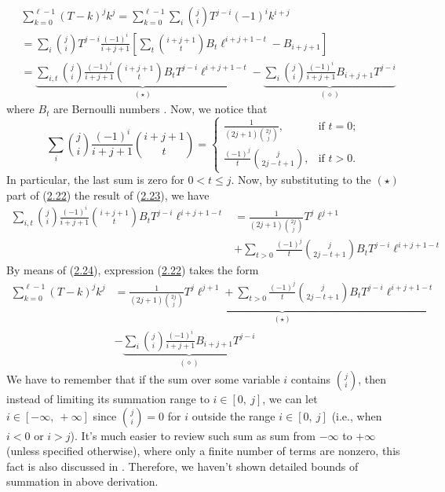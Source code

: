 \documentclass[11pt, letterpaper]{amsart}
\theoremstyle{definition}
\theoremstyle{remark}
\numberwithin{equation}{section}
\begin{document}
\begin{equation}\label{gen_5}
\begin{split}
&\sum_{k=0}^{\ell-1} (T-k)^j k^j =\sum_{k=0}^{\ell-1} \sum_{i} \binom{j}i T^{j-i} (-1)^i k^{i+j}\\
&=\sum_{i} \binom{j}{i} T^{j-i} \frac{(-1)^i}{i+j+1} \left[ \sum_{t} \binom{i+j+1}t B_t \ell^{i+j+1-t} - B_{i+j+1}\right] \\
&=\underbrace{\sum_{i,t}\binom{j}{i} \frac{(-1)^i}{i+j+1} \binom{i+j+1}t B_tT^{j-i}\ell^{i+j+1-t}}_{(\star)}
- \underbrace{\sum_{i} \binom{j}{i}  \frac{(-1)^i}{i+j+1} B_{i+j+1} T^{j-i}}_{(\diamond)}
\end{split}
\end{equation}
where $B_t$ are Bernoulli numbers \cite{14}. Now, we notice that
\begin{equation}\label{gen_6}
\sum_{i} \binom{j}{i} \frac{(-1)^i}{i+j+1} \binom{i+j+1}t
=\begin{cases}
\frac{1}{(2j+1)\binom{2j}j}, & \text{if } t=0;\\
\frac{(-1)^j}{t}\binom{j}{2j-t+1}, & \text{if } t>0.
\end{cases}
\end{equation}
In particular, the last sum is zero for $0<t\leq j$. Now, by substituting to the $(\star)$ part of
(\hyperref[gen_5]{2.22}) the result of (\hyperref[gen_6]{2.23}), we have
\begin{equation}\label{gen_6_1_2}
\begin{split}
\sum_{i,t}\binom{j}{i} \frac{(-1)^i}{i+j+1} \binom{i+j+1}{t} B_tT^{j-i}\ell^{i+j+1-t}
&= \frac{1}{(2j+1)\binom{2j}j}T^{j}\ell^{j+1}\\
&+\sum_{t>0} \frac{(-1)^j}{t}\binom{j}{2j-t+1} B_t T^{j-i}\ell^{i+j+1-t}
\end{split}
\end{equation}
By means of (\hyperref[gen_6_1_2]{2.24}), expression (\hyperref[gen_5]{2.22}) takes the form
\begin{equation}\label{gen_6_1}
\begin{split}
\sum_{k=0}^{\ell-1} (T-k)^j k^j
&=\underbrace{\frac{1}{(2j+1)\binom{2j}j}T^{j}\ell^{j+1}+\sum_{t>0}\frac{(-1)^j}{t}\binom{j}{2j-t+1} B_t T^{j-i}\ell^{i+j+1-t}}_{(\star)} \\
&- \underbrace{\sum_{i} \binom{j}{i}  \frac{(-1)^i}{i+j+1} B_{i+j+1} T^{j-i}}_{(\diamond)}
\end{split}
\end{equation}
We have to remember that if the sum over some variable $i$ contains $\binom{j}{i}$, then instead of limiting its summation range to $i\in[0, \ j]$, we can let $i\in[-\infty, \ +\infty]$ since $\binom{j}{i} = 0$ for $i$ outside the range $i\in[0, \ j]$ (i.e., when $i<0$ or $i>j$). It's much easier to review such sum as sum from $-\infty$ to $+\infty$ (unless specified otherwise), where only a finite number of terms are nonzero, this fact is also discussed in \cite{12}. Therefore, we haven't shown detailed bounds of summation in above derivation.
\end{document}
